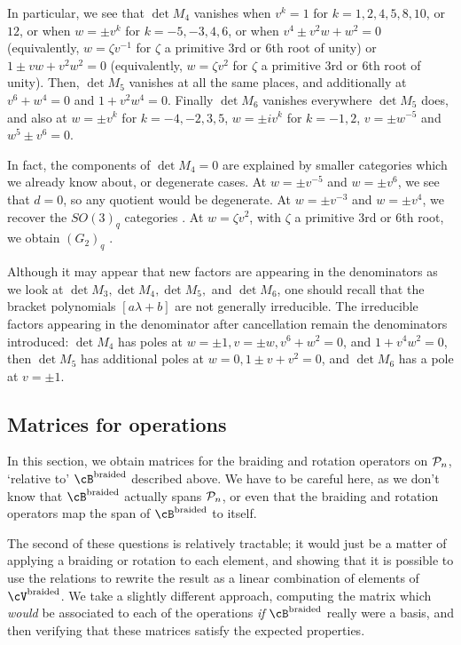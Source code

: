 \documentclass[12pt]{amsart}
\begin{document}
In particular, we see that $\det M_4$ vanishes when $v^k = 1$ for $k=1,2,4,5,8,10$, or $12$, or when $w = \pm v^k$ for $k=-5,-3,4,6$, or when $v^4 \pm v^2 w + w^2 = 0$ (equivalently, $w = \zeta v^{-1}$ for $\zeta$ a primitive 3rd or 6th root of unity) or $1 \pm v w + v^2 w^2 = 0$ (equivalently, $w = \zeta v^2$ for $\zeta$ a primitive 3rd or 6th root of unity). Then, $\det M_5$ vanishes at all the same places, and additionally at $v^6 + w^4 = 0$ and $1 + v^2 w^4 = 0$. 
Finally $\det M_6$ vanishes everywhere $\det M_5$ does, and also at $w = \pm v^k$ for $k=-4,-2,3,5$, $w = \pm i v^k$ for $k=-1,2$, $v = \pm w^{-5}$ and $w^5 \pm v^6 = 0$.

In fact, the components of $\det M_4 = 0$ are explained by smaller categories which we already know about, or degenerate cases.
At $w = \pm v^{-5}$ and $w = \pm v^6$, we see that $d=0$, so any quotient would be degenerate. At $w = \pm v^{-3}$ and $w = \pm v^4$, we recover the $SO(3)_q$ categories . At $w = \zeta v^2$, with $\zeta$ a primitive 3rd or 6th root, we obtain $(G_2)_q$ . 

Although it may appear that new factors are appearing in the
denominators as we look at $\det M_3, \det M_4, \det M_5, $ and $\det
M_6$, one should recall that the bracket polynomials $[a \lambda + b]$
are not generally irreducible.  The
irreducible factors appearing in the denominator after cancellation
remain the denominators  introduced: $\det M_4$ has poles
at $w=\pm1, v=\pm w, v^6+w^2 = 0$, and $1+v^4w^2 = 0$,
then $\det M_5$ has additional poles at $w=0, 1\pm v + v^2 = 0$, and $\det M_6$
has a pole at $v = \pm 1$.


\subsection{Matrices for operations}
In this section, we obtain matrices for the braiding and rotation operators on
 $\mathcal{P}_n$, `relative to' $\cB^{\text{braided}}$ described above.
We have to be careful here, as we don't know that $\cB^{\text{braided}}$
actually spans $\mathcal{P}_n$, or even that the braiding and rotation operators map
the span of $\cB^{\text{braided}}$ to itself.

The second of these questions is relatively tractable; it would just be a
matter of applying a braiding or rotation to each element, and showing that it
is possible to use the relations to rewrite the result as a linear combination
of elements of $\cV^{\text{braided}}$. We take a slightly different approach,
computing the matrix which \emph{would} be associated to each of the
operations \emph{if} $\cB^{\text{braided}}$ really were a basis, and then
verifying that these matrices satisfy the expected properties.
\end{document}
